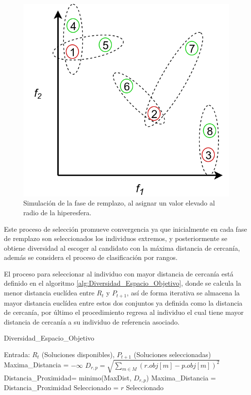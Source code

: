\begin{figure}[H]
\centering
\scriptsize
\includegraphics[scale=0.2]
{Figures_Chapter3/Distancia_Cercania.png}
\decoRule
\caption{Simulación de la fase de remplazo, al asignar un valor elevado al radio de la hiperesfera.}
\label{fig:Distancia_Cercania}
\end{figure}

Este proceso de selección promueve convergencia ya que inicialmente en cada fase de remplazo son seleccionados los individuos extremos, y posteriormente se obtiene diversidad al escoger al candidato con la máxima distancia de cercanía, además se considera el proceso de clasificación por rangos.
%

El proceso para seleccionar al individuo con mayor distancia de cercanía está definido en el algoritmo \ref{alg:Diversidad_Espacio_Objetivo}, donde se calcula la menor distancia euclídea entre $R_t$ y $P_{t+1}$, así  de forma iterativa se almacena la mayor distancia euclídea entre estos dos conjuntos ya definida como la distancia de cercanía, por último el procedimiento regresa al individuo el cual tiene mayor distancia de cercanía a su individuo de referencia asociado.


\begin{algorithm}[H]
\scriptsize
	\caption{Diversidad\_Espacio\_Objetivo} 
	\label{alg:Diversidad_Espacio_Objetivo}
	\begin{algorithmic}[1] 
	\STATE Entrada: $R_t$ (Soluciones disponibles), $P_{t+1}$ (Soluciones seleccionadas)
	   \STATE Maxima\_Distancia = $-\infty$
		\STATE $D_{r,p} = \sqrt{ \sum_{ m \in M} (r.obj[m] -  p.obj[m])^2  }$
		\STATE Distancia\_Proximidad= minimo(MaxDist, $D_{r,p}$)
	   \ENDFOR
		\STATE Maxima\_Distancia = Distancia\_Proximidad
		\STATE Seleccionado = $r$
	   \ENDIF
	\ENDFOR
	\RETURN Seleccionado
	\end{algorithmic}
\end{algorithm}


